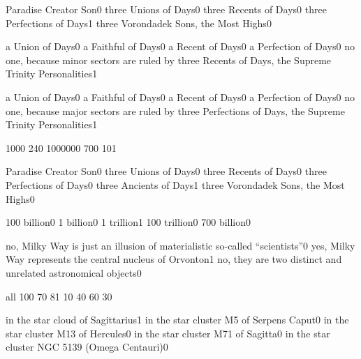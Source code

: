{Paradise Creator Son}{0}
{three Unions of Days}{0}
{three Recents of Days}{0}
{three Perfections of Days}{1}
{three Vorondadek Sons, the Most Highs}{0}
\qstop

{a Union of Days}{0}
{a Faithful of Days}{0}
{a Recent of Days}{0}
{a Perfection of Days}{0}
{no one, because minor sectors are ruled by three Recents of Days, the Supreme Trinity Personalities}{1}
\qstop

{a Union of Days}{0}
{a Faithful of Days}{0}
{a Recent of Days}{0}
{a Perfection of Days}{0}
{no one, because major sectors are ruled by three Perfections of Days, the Supreme Trinity Personalities}{1}
\qstop

{100}{0}
{24}{0}
{100000}{0}
{70}{0}
{10}{1}
\qstop

{Paradise Creator Son}{0}
{three Unions of Days}{0}
{three Recents of Days}{0}
{three Perfections of Days}{0}
{three Ancients of Days}{1}
{three Vorondadek Sons, the Most Highs}{0}
\qstop

{100 billion}{0}
{1 billion}{0}
{1 trillion}{1}
{100 trillion}{0}
{700 billion}{0}
\qstop

{no, Milky Way is just an illusion of materialistic so-called ``scientists''}{0}
{yes, Milky Way represents the central nucleus of Orvonton}{1}
{no, they are two distinct and unrelated astronomical objects}{0}
\qstop

{all 10}{0}
{7}{0}
{8}{1}
{1}{0}
{4}{0}
{6}{0}
{3}{0}
\qstop

{in the star cloud of Sagittarius}{1}
{in the star cluster M5 of Serpens Caput}{0}
{in the star cluster M13 of Hercules}{0}
{in the star cluster M71 of Sagitta}{0}
{in the star cluster NGC 5139 (Omega Centauri)}{0}
\qstop

